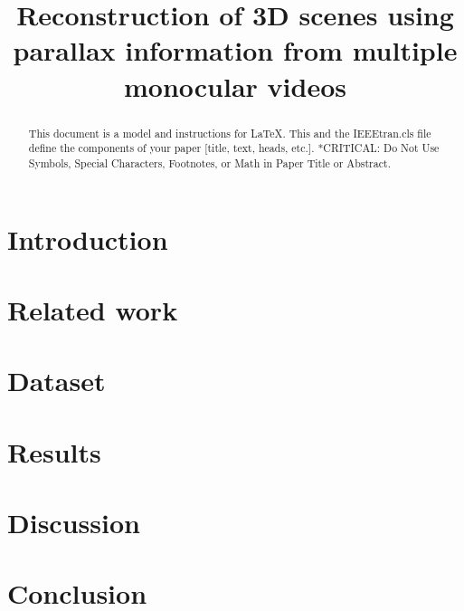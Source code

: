 \documentclass[conference]{IEEEtran}
\begin{document}
\title{Reconstruction of 3D scenes using parallax information from multiple monocular videos} %

\author{
}

\maketitle

\begin{abstract}
This document is a model and instructions for \LaTeX.
This and the IEEEtran.cls file define the components of your paper [title, text, heads, etc.]. *CRITICAL:
Do Not Use Symbols, Special Characters, Footnotes, or Math in Paper Title or Abstract.
\end{abstract}

\begin{IEEEkeywords}
\end{IEEEkeywords}

\section{Introduction}


\section{Related work}


\section{Dataset}


\section{Results}


\section{Discussion}


\section{Conclusion}





\end{document}
